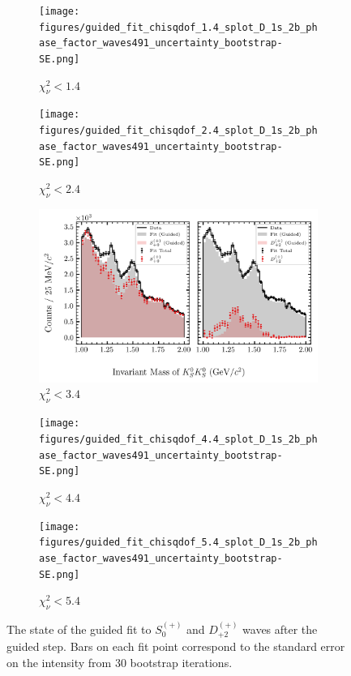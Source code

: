 \begin{figure}[htbp]
    \centering
    \begin{subfigure}{0.45\textwidth}
        \texttt{[image: figures/guided\_fit\_chisqdof\_1.4\_splot\_D\_1s\_2b\_phase\_factor\_waves491\_uncertainty\_bootstrap-SE.png]}
        \caption{$\chi^2_\nu < 1.4$}
    \end{subfigure}
    \hfill
    \begin{subfigure}{0.45\textwidth}
        \texttt{[image: figures/guided\_fit\_chisqdof\_2.4\_splot\_D\_1s\_2b\_phase\_factor\_waves491\_uncertainty\_bootstrap-SE.png]}
        \caption{$\chi^2_\nu < 2.4$}
    \end{subfigure}

    \vspace{1em}

    \begin{subfigure}{0.8\textwidth}
        \includegraphics[width=\linewidth]{figures/guided_fit_chisqdof_3.4_splot_D_1s_2b_phase_factor_waves491_uncertainty_bootstrap-SE.png}
        \caption{$\chi^2_\nu < 3.4$}
    \end{subfigure}

    \vspace{1em}

    \begin{subfigure}{0.45\textwidth}
        \texttt{[image: figures/guided\_fit\_chisqdof\_4.4\_splot\_D\_1s\_2b\_phase\_factor\_waves491\_uncertainty\_bootstrap-SE.png]}
        \caption{$\chi^2_\nu < 4.4$}
    \end{subfigure}
    \hfill
    \begin{subfigure}{0.45\textwidth}
        \texttt{[image: figures/guided\_fit\_chisqdof\_5.4\_splot\_D\_1s\_2b\_phase\_factor\_waves491\_uncertainty\_bootstrap-SE.png]}
        \caption{$\chi^2_\nu < 5.4$}
    \end{subfigure}

    \caption{The state of the guided fit to $S_{0}^{(+)}$ and $D_{+2}^{(+)}$ waves after the guided step. Bars on each fit point correspond to the standard error on the intensity from $ 30 $ bootstrap iterations.}
    \label{fig:guided-fit-all-Sp-D2p}
\end{figure}

